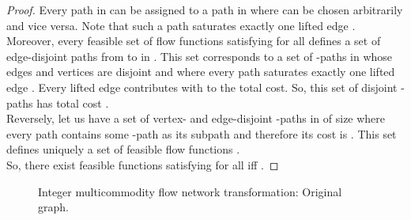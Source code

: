 \documentclass{article}
\begin{document}
\begin{proof}
Every path  in  can be assigned to a path  in  where  can be chosen arbitrarily and vice versa. Note that such a path  saturates exactly one lifted edge .
Moreover, every feasible set of flow functions  satisfying  for all   defines a set of edge-disjoint paths from  to  in .
This set corresponds to a set of  -paths in  whose edges and vertices are disjoint and where every path saturates exactly one lifted edge .  Every lifted edge contributes with  to the total cost. So, this set of disjoint -paths has total cost .\\
Reversely, let us have a set of vertex- and edge-disjoint -paths in  of size  where every path contains some -path as its subpath and therefore its cost is . This set defines uniquely a set of feasible flow functions .\\
So, there exist feasible functions  
 satisfying  for all 
 iff .


\end{proof}




\begin{figure}
\begin{center}
 \caption{Integer multicommodity flow network transformation: Original graph.}
\label{fig:mcf-reduction}
\end{center}
\end{figure}
\end{document}
